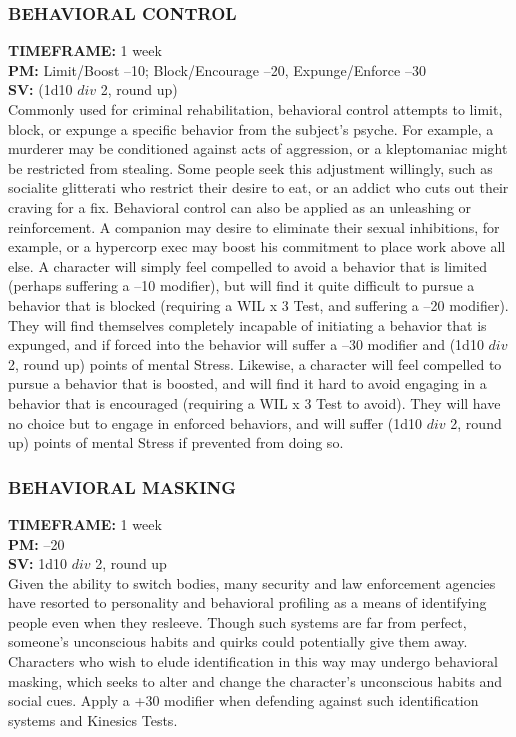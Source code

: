 \subsubsection{BEHAVIORAL CONTROL}
\textbf{TIMEFRAME:} 1 week \\
\textbf{PM:} Limit/Boost –10; Block/Encourage –20, Expunge/Enforce –30 \\
\textbf{SV:} (1d10 $div$ 2, round up) \\
Commonly used for criminal rehabilitation, behavioral
control attempts to limit, block, or expunge a
specific behavior from the subject’s psyche. For example,
a murderer may be conditioned against acts of aggression,
or a kleptomaniac might be restricted from
stealing. Some people seek this adjustment willingly,
such as socialite glitterati who restrict their desire to
eat, or an addict who cuts out their craving for a fix.
Behavioral control can also be applied as an unleashing
or reinforcement. A companion may desire
to eliminate their sexual inhibitions, for example, or
a hypercorp exec may boost his commitment to place
work above all else.
A character will simply feel compelled to avoid
a behavior that is limited (perhaps suffering a –10
modifier), but will find it quite difficult to pursue a behavior
that is blocked (requiring a WIL x 3 Test, and
suffering a –20 modifier). They will find themselves
completely incapable of initiating a behavior that is
expunged, and if forced into the behavior will suffer
a –30 modifier and (1d10 $div$ 2, round up) points of
mental Stress.
Likewise, a character will feel compelled to pursue a
behavior that is boosted, and will find it hard to avoid
engaging in a behavior that is encouraged (requiring a
WIL x 3 Test to avoid). They will have no choice but
to engage in enforced behaviors, and will suffer (1d10
$div$ 2, round up) points of mental Stress if prevented
from doing so.

\subsubsection{BEHAVIORAL MASKING}
\textbf{TIMEFRAME:} 1 week \\
\textbf{PM:} –20 \\
\textbf{SV:} 1d10 $div$ 2, round up \\
Given the ability to switch bodies, many security and
law enforcement agencies have resorted to personality
and behavioral profiling as a means of identifying
people even when they resleeve. Though such systems
are far from perfect, someone’s unconscious habits
and quirks could potentially give them away. Characters
who wish to elude identification in this way may
undergo behavioral masking, which seeks to alter and
change the character’s unconscious habits and social
cues. Apply a +30 modifier when defending against
such identification systems and Kinesics Tests.

